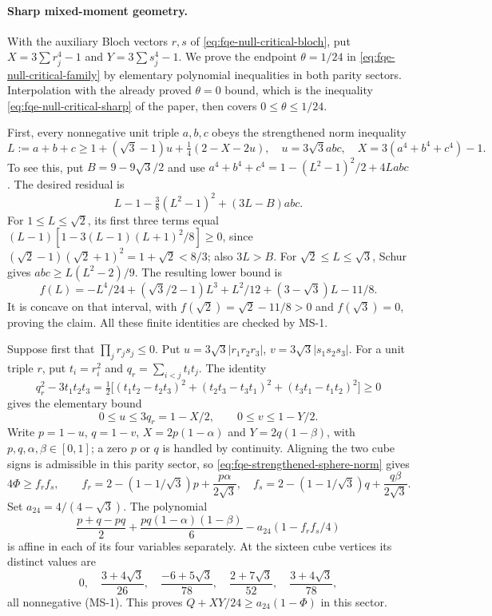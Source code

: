 \paragraph{Sharp mixed-moment geometry.}
With the auxiliary Bloch vectors $r,s$ of
\eqref{eq:fqe-null-critical-bloch}, put
$X=3\sum r_j^4-1$ and $Y=3\sum s_j^4-1$.
We prove the endpoint $\theta=1/24$ in
\eqref{eq:fqe-null-critical-family} by elementary polynomial inequalities in both parity sectors.
Interpolation with the already proved $\theta=0$ bound, which is the inequality
\eqref{eq:fqe-null-critical-sharp} of the paper, then covers
$0\le\theta\le1/24$.

First, every nonnegative unit triple $a,b,c$ obeys the strengthened norm
inequality
\begin{equation}\label{eq:fqe-strengthened-sphere-norm}
 L:=a+b+c\ge1+(\sqrt3-1)u+\tfrac14(2-X-2u),\quad
 u=3\sqrt3abc,\quad X=3(a^4+b^4+c^4)-1.
\end{equation}
To see this, put $B=9-9\sqrt3/2$ and use
$a^4+b^4+c^4=1-(L^2-1)^2/2+4Labc$.
The desired residual is
\[
 L-1-\tfrac38(L^2-1)^2+(3L-B)abc.
\]
For $1\le L\le\sqrt2$, its first three terms equal
$(L-1)[1-3(L-1)(L+1)^2/8]\ge0$, since
$(\sqrt2-1)(\sqrt2+1)^2=1+\sqrt2<8/3$; also $3L>B$.
For $\sqrt2\le L\le\sqrt3$, Schur gives
$abc\ge L(L^2-2)/9$. The resulting lower bound is
\[
 f(L)=-L^4/24+(\sqrt3/2-1)L^3+L^2/12+(3-\sqrt3)L-11/8.
\]
It is concave on that interval, with
$f(\sqrt2)=\sqrt2-11/8>0$ and $f(\sqrt3)=0$, proving the claim.
All these finite identities are checked by MS-1.

Suppose first that $\prod_jr_js_j\le0$.
Put $u=3\sqrt3|r_1r_2r_3|$, $v=3\sqrt3|s_1s_2s_3|$.
For a unit triple $r$, put $t_i=r_i^2$ and $q_r=\sum_{i<j}t_it_j$. The identity
\[
 q_r^2-3t_1t_2t_3
 =\tfrac12\bigl[(t_1t_2-t_2t_3)^2+(t_2t_3-t_3t_1)^2
                         +(t_3t_1-t_1t_2)^2\bigr]\ge0
\]
gives the elementary bound
\begin{equation}\label{eq:fqe-bloch-triple-product}
 0\le u\le3q_r=1-X/2,\qquad 0\le v\le1-Y/2.
\end{equation}
Write $p=1-u$, $q=1-v$, $X=2p(1-\alpha)$ and
$Y=2q(1-\beta)$, with $p,q,\alpha,\beta\in[0,1]$; a zero
$p$ or $q$ is handled by continuity.
Aligning the two cube signs is admissible in this parity sector, so
\eqref{eq:fqe-strengthened-sphere-norm} gives
\[
 4\Phi\ge f_rf_s,\qquad
 f_r=2-(1-1/\sqrt3)p+\frac{p\alpha}{2\sqrt3},\quad
 f_s=2-(1-1/\sqrt3)q+\frac{q\beta}{2\sqrt3}.
\]
Set $a_{24}=4/(4-\sqrt3)$. The polynomial
\[
 \frac{p+q-pq}{2}+\frac{pq(1-\alpha)(1-\beta)}6
                   -a_{24}(1-f_rf_s/4)
\]
is affine in each of its four variables separately.
At the sixteen cube vertices its distinct values are
\[
 0,\quad \frac{3+4\sqrt3}{26},\quad
 \frac{-6+5\sqrt3}{78},\quad
 \frac{2+7\sqrt3}{52},\quad \frac{3+4\sqrt3}{78},
\]
all nonnegative (MS-1). This proves
$Q+XY/24\ge a_{24}(1-\Phi)$ in this sector.

